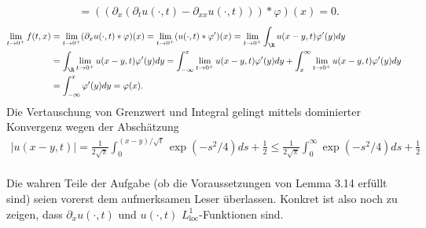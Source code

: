 \begin{solution}
\begin{enumerate}[label = (\roman*)]
\begin{align*}
    &= ((\partial_{x} (\partial_t u(\cdot,t) - \partial_{xx} u(\cdot,t))) \ast \varphi)(x) = 0.
  \end{align*}
  \begin{align*}
    \lim_{t \to 0^+} f(t,x) &= \lim_{t \to 0^+} (\partial_x u(\cdot,t)\ast \varphi)(x)
    = \lim_{t \to 0^+} (u(\cdot,t)\ast \varphi^{\prime})(x)
    = \lim_{t \to 0^+} \int_{\R}u(x-y,t) \varphi^{\prime}(y) dy \\
    &= \int_{\R}\lim_{t \to 0^+} u(x-y,t) \varphi^{\prime}(y) dy
    = \int_{-\infty}^x \lim_{t \to 0^+} u(x-y,t) \varphi^{\prime}(y) dy
    + \int_{x}^{\infty} \lim_{t \to 0^+} u(x-y,t) \varphi^{\prime}(y) dy \\
    &= \int_{-\infty}^x \varphi^{\prime}(y) dy = \varphi(x).
  \end{align*}
  Die Vertauschung von Grenzwert und Integral gelingt mittels dominierter Konvergenz
  wegen der Abschätzung
  \begin{align*}
    |u(x-y,t)| = \frac{1}{2\sqrt{\pi}}\int_0^{(x-y)/\sqrt{t}}\exp(-s^2/4)ds + \frac{1}{2}
    \leq \frac{1}{2\sqrt{\pi}}\int_0^{\infty}\exp(-s^2/4)ds + \frac{1}{2}
  \end{align*} \\
  Die wahren Teile der Aufgabe (ob
  die Voraussetzungen von Lemma 3.14 erfüllt sind) seien vorerst dem aufmerksamen Leser überlassen.
  Konkret ist also noch zu zeigen, dass $\partial_x u(\cdot,t)$ und $u(\cdot,t)$
  $L_{\mathrm{loc}}^1$-Funktionen sind.
\end{enumerate}

\end{solution}

